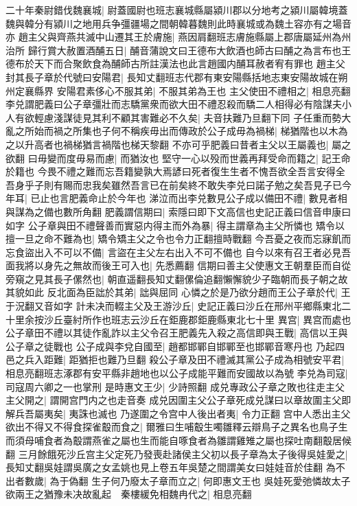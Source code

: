 二十年秦尉錯伐魏襄城|{
	尉蓋國尉也班志襄城縣屬潁川郡以分地考之潁川屬韓境蓋魏與韓分有潁川之地用兵争彊疆場之間朝韓暮魏則此時襄城或為魏土容亦有之場音亦}
趙主父與齊燕共滅中山遷其王於膚施|{
	燕因肩翻班志膚施縣屬上郡唐屬延州為州治所}
歸行賞大赦置酒酺五日|{
	酺音蒲說文曰王德布大飲酒也師古曰酺之為言布也王德布於天下而合聚飲食為酺師古所註漢法也此言趙國内酺耳赦者宥有罪也}
趙主父封其長子章於代號曰安陽君|{
	長知丈翻班志代郡有東安陽縣括地志東安陽故城在朔州定襄縣界}
安陽君素侈心不服其弟|{
	不服其弟為王也}
主父使田不禮相之|{
	相息亮翻}
李兑謂肥義曰公子章彊壯而志驕黨衆而欲大田不禮忍殺而驕二人相得必有陰謀夫小人有欲輕慮淺謀徒見其利不顧其害難必不久矣|{
	夫音扶難乃旦翻下同}
子任重而勢大亂之所始而禍之所集也子何不稱疾毋出而傳政於公子成毋為禍梯|{
	梯猶階也以木為之以升高者也禍梯猶言禍階也梯天黎翻}
不亦可乎肥義曰昔者主父以王屬義也|{
	屬之欲翻}
曰毋變而度毋易而慮|{
	而猶汝也}
堅守一心以殁而世義再拜受命而籍之|{
	記王命於籍也}
今畏不禮之難而忘吾籍變孰大焉諺曰死者復生生者不愧吾欲全吾言安得全吾身乎子則有賜而忠我矣雖然吾言已在前矣終不敢失李兑曰諾子勉之矣吾見子已今年耳|{
	已止也言肥義命止於今年也}
涕泣而出李兑數見公子成以備田不禮|{
	數見者相與謀為之備也數所角翻}
肥義謂信期曰|{
	索隱曰即下文高信也史記正義曰信音申康曰如字}
公子章與田不禮聲善而實惡内得主而外為暴|{
	得主謂章為主父所憐也}
矯令以擅一旦之命不難為也|{
	矯令矯主父之令也令力正翻擅時戰翻}
今吾憂之夜而忘寐飢而忘食盜出入不可以不備|{
	言盜在主父左右出入不可不備也}
自今以來有召王者必見吾面我將以身先之無故而後王可入也|{
	先悉薦翻}
信期曰善主父使惠文王朝羣臣而自從旁窺之見其長子傫然也|{
	朝直遥翻長知丈翻傫倫追翻懶懈貌少子臨朝而長子朝之故其貌如此}
反北面為臣詘於其弟|{
	詘與屈同}
心憐之於是乃欲分趙而王公子章於代|{
	王于況翻又音如字}
計未决而輟主父及王游沙丘|{
	史記正義曰沙丘在邢州平鄉縣東北二十里余按沙丘臺紂所作也班志云沙丘在鉅鹿郡鉅鹿縣東北七十里}
異宫|{
	異宫而處也}
公子章田不禮以其徒作亂詐以主父令召王肥義先入殺之高信即與王戰|{
	高信以王與公子章之徒戰也}
公子成與李兌自國至|{
	趙都邯鄲自邯鄲至也邯鄲音寒丹也}
乃起四邑之兵入距難|{
	距猶拒也難乃旦翻}
殺公子章及田不禮滅其黨公子成為相號安平君|{
	相息亮翻班志涿郡有安平縣非趙地也以公子成能平難而安國故以為號}
李兑為司寇|{
	司寇周六卿之一也掌刑}
是時惠文王少|{
	少詩照翻}
成兑專政公子章之敗也往走主父主父開之|{
	謂開宫門内之也走音奏}
成兑因圍主父公子章死成兑謀曰以章故圍主父即解兵吾屬夷矣|{
	夷誅也滅也}
乃遂圍之令宫中人後出者夷|{
	令力正翻}
宫中人悉出主父欲出不得又不得食探雀鷇而食之|{
	爾雅曰生哺鷇生噣雛釋云辯鳥子之異名也鳥子生而須母哺食者為鷇謂燕雀之屬也生而能自啄食者為雛謂雞雉之屬也探吐南翻鷇居候翻}
三月餘餓死沙丘宫主父定死乃發喪赴諸侯主父初以長子章為太子後得吳娃愛之|{
	長知丈翻吳娃謂吳廣之女孟姚也見上卷五年吳楚之間謂美女曰娃娃音於佳翻}
為不出者數歲|{
	為于偽翻}
生子何乃廢太子章而立之|{
	何即惠文王也}
吳娃死愛弛憐故太子欲兩王之猶豫未决故亂起　秦樓緩免相魏冉代之|{
	相息亮翻}


